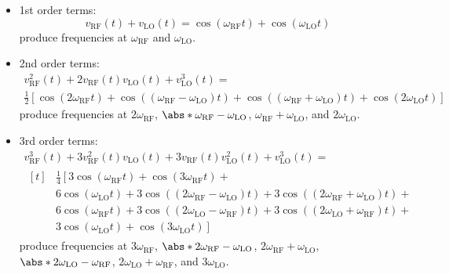 \documentclass{article}
\begin{document}
\begin{itemize}
    \item 1st order terms:
          \begin{equation*}
              v_{\mathrm{RF}}\left( t \right) + v_{\mathrm{LO}}\left( t \right) = \cos{\left( \omega_{\mathrm{RF}} t \right)} + \cos{\left( \omega_{\mathrm{LO}} t \right)}
          \end{equation*}
          produce frequencies at \(\omega_{\mathrm{RF}}\) and \(\omega_{\mathrm{LO}}\).
    \item 2nd order terms:
          \begin{multline*}
              v_{\mathrm{RF}}^2\left( t \right) + 2 v_{\mathrm{RF}}\left( t \right) v_{\mathrm{LO}}\left( t \right) + v_{\mathrm{LO}}^3\left( t \right) = \\
              \frac{1}{2} \left[ \cos{\left( 2\omega_{\mathrm{RF}} t \right)} + \cos{\left( \left( \omega_{\mathrm{RF}} - \omega_{\mathrm{LO}} \right) t \right)} + \cos{\left( \left( \omega_{\mathrm{RF}} + \omega_{\mathrm{LO}} \right) t \right)} + \cos{\left( 2\omega_{\mathrm{LO}} t \right)} \right]
          \end{multline*}
          produce frequencies at \(2\omega_{\mathrm{RF}}\), \(\abs*{\omega_{\mathrm{RF}} - \omega_{\mathrm{LO}}}\), \(\omega_{\mathrm{RF}} + \omega_{\mathrm{LO}}\), and \(2\omega_{\mathrm{LO}}\).
    \item 3rd order terms:
          \begin{multline*}
              v_{\mathrm{RF}}^3\left( t \right) + 3 v_{\mathrm{RF}}^2\left( t \right) v_{\mathrm{LO}}\left( t \right) + 3 v_{\mathrm{RF}}\left( t \right) v_{\mathrm{LO}}^2\left( t \right) + v_{\mathrm{LO}}^3\left( t \right) = \\
              \begin{aligned}[t]
                   & \frac{1}{4} \left[ 3 \cos{\left( \omega_{\mathrm{RF}} t \right)} + \cos{\left( 3\omega_{\mathrm{RF}} t \right)} \right. +                                                                                                     \\
                   & 6\cos{\left( \omega_{\mathrm{LO}} t \right)} + 3\cos{\left( \left( 2\omega_{\mathrm{RF}} - \omega_{\mathrm{LO}} \right) t \right)} + 3\cos{\left( \left( 2\omega_{\mathrm{RF}} + \omega_{\mathrm{LO}} \right) t \right)} + {} \\
                   & 6\cos{\left( \omega_{\mathrm{RF}} t \right)} + 3\cos{\left( \left( 2\omega_{\mathrm{LO}} - \omega_{\mathrm{RF}} \right) t \right)} + 3\cos{\left( \left( 2\omega_{\mathrm{LO}} + \omega_{\mathrm{RF}} \right) t \right)} + {} \\
                   & \left. 3 \cos{\left( \omega_{\mathrm{LO}} t \right)} + \cos{\left( 3\omega_{\mathrm{LO}} t \right)} \right]
              \end{aligned}
          \end{multline*}
          produce frequencies at \(3\omega_{\mathrm{RF}}\), \(\abs*{2\omega_{\mathrm{RF}} - \omega_{\mathrm{LO}}}\), \(2\omega_{\mathrm{RF}} + \omega_{\mathrm{LO}}\), \(\abs*{2\omega_{\mathrm{LO}} - \omega_{\mathrm{RF}}}\), \(2\omega_{\mathrm{LO}} + \omega_{\mathrm{RF}}\), and \(3\omega_{\mathrm{LO}}\).
\end{itemize}
\end{document}
